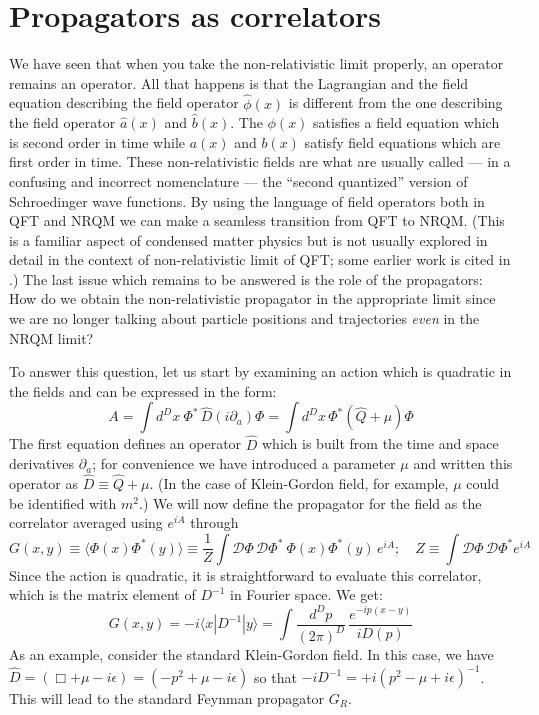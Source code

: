 \documentclass[12pt]{article}
\def\bk#1#2#3{{\langle #1|#2|#3\rangle}}  %
\begin{document}
\section{Propagators as correlators}\label{sec:prcor}

We have seen that when you take the non-relativistic limit properly, an operator remains an operator. All that happens is that the Lagrangian and the field equation describing the field operator $\hat{\phi}(x)$ is different from the one describing the field operator $\hat{a}(x)$ and $\hat{b}(x)$. The $\phi(x)$ satisfies a field equation which is second order in time while $a(x)$ and $b(x)$ satisfy field equations which are first order in time. These non-relativistic fields are what are usually called --- in a confusing and incorrect nomenclature --- the ``second quantized'' version of Schroedinger wave functions. 
By using the language of field operators both in QFT and NRQM we can make a seamless transition from QFT to NRQM. (This is a familiar aspect of condensed matter physics but is not usually explored in detail in the context of non-relativistic limit of QFT; some earlier work is cited in \cite{G}.) The last issue which remains to be answered is the role of the propagators: How do we obtain the non-relativistic propagator in the appropriate limit since we are no longer talking about particle positions and trajectories \textit{even }in the NRQM limit? 
 
 To answer this question, let us start by examining an action which is quadratic in the fields and can be expressed in the form:
\begin{equation}
 A = \int d^D x\ \Phi^* \, \hat{D}(i \partial_a) \Phi = \int d^D x\, \Phi^*(\hat Q + \mu) \Phi
\end{equation} 
 The first equation defines an operator $\hat{D}$ which is built from the time and space derivatives $\partial_a$; for convenience we have introduced a parameter $\mu$ and written this operator as $\hat D \equiv \hat Q +\mu$. (In the case of Klein-Gordon field, for example, $\mu$ could be identified with $m^2$.) We will now define the propagator for the field as the correlator averaged using $e^{iA}$ through 
\begin{equation}
 G(x,y) \equiv\langle \Phi(x)\Phi^*(y)\rangle \equiv  \frac{1}{Z} \int \mathcal{D}\Phi\, \mathcal{D}\Phi^*\ \Phi(x) \Phi^*(y) \, e^{iA}; \quad Z\equiv \int \mathcal{D}\Phi\, \mathcal{D}\Phi^* e^{iA}
\end{equation} 
Since the action is quadratic, it is straightforward to evaluate this correlator, which is the matrix element of $D^{-1}$  in Fourier space. We get:
\begin{equation}
 G(x,y) = -i \bk{x}{D^{-1}}{y} = \int\frac{d^D p}{(2\pi)^D} \, \frac{e^{-ip(x-y)}}{iD(p)}
\end{equation} 
  As an example,  consider the standard Klein-Gordon field. In this case, we have 
$
 \hat D = (\Box + \mu - i \epsilon) = (-p^2 + \mu - i \epsilon)
$ so that 
$
 - i D^{-1} = +i (p^2  - \mu + i \epsilon)^{-1}
$. This will lead to the standard Feynman propagator $G_R$.  
\end{document}
